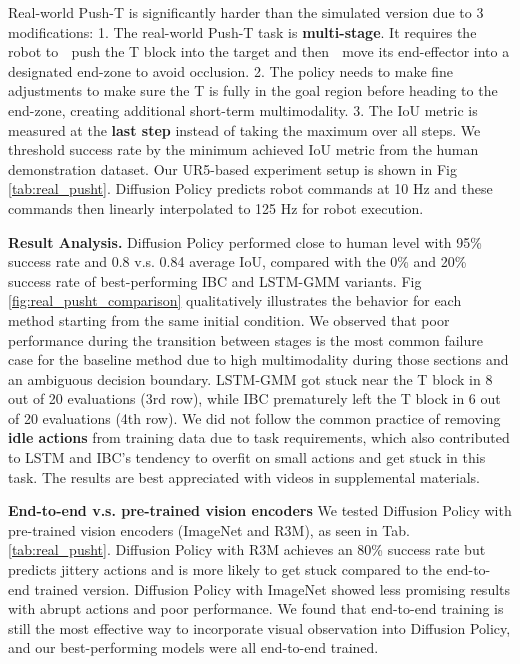 \documentclass[Afour,sageh,times]{sagej}
\begin{document}
Real-world Push-T is significantly harder than the simulated version due to 3 modifications: 1. The real-world Push-T task is \textbf{multi-stage}. It requires the robot to \textcircled{} push the T block into the target and then \textcircled{} move its end-effector into a designated end-zone to avoid occlusion. 2. The policy needs to make fine adjustments to make sure the T is fully in the goal region before heading to the end-zone, creating additional short-term multimodality. 3. The IoU metric is measured at the \textbf{last step} instead of taking the maximum over all steps. We threshold success rate by the minimum achieved IoU metric from the human demonstration dataset. Our UR5-based experiment setup is shown in Fig \ref{tab:real_pusht}. Diffusion Policy predicts robot commands at 10 Hz and these commands then linearly interpolated to 125 Hz for robot execution.




\textbf{Result Analysis.}
Diffusion Policy performed close to human level with 95\% success rate and 0.8 v.s. 0.84 average IoU, compared with the 0\% and 20\% success rate of best-performing IBC and LSTM-GMM variants. Fig \ref{fig:real_pusht_comparison} qualitatively illustrates the behavior for each method starting from the same initial condition.
We observed that poor performance during the transition between stages is the most common failure case for the baseline method due to high multimodality during those sections and an ambiguous decision boundary. LSTM-GMM got stuck near the T block in 8 out of 20 evaluations (3rd row), while IBC prematurely left the T block in 6 out of 20 evaluations (4th row).
We did not follow the common practice of removing \textbf{idle actions} from training data due to task requirements, which also contributed to LSTM and IBC's tendency to overfit on small actions and get stuck in this task. The results are best appreciated with videos in supplemental materials.







\textbf{End-to-end v.s. pre-trained vision encoders}
We tested Diffusion Policy with pre-trained vision encoders (ImageNet \cite{deng2009imagenet} and R3M\cite{nair2022r3m}), as seen in Tab. \ref{tab:real_pusht}. Diffusion Policy with R3M achieves an 80\% success rate but predicts jittery actions and is more likely to get stuck compared to the end-to-end trained version. Diffusion Policy with ImageNet showed less promising results with abrupt actions and poor performance. We found that end-to-end training is still the most effective way to incorporate visual observation into Diffusion Policy, and our best-performing models were all end-to-end trained.
\end{document}

